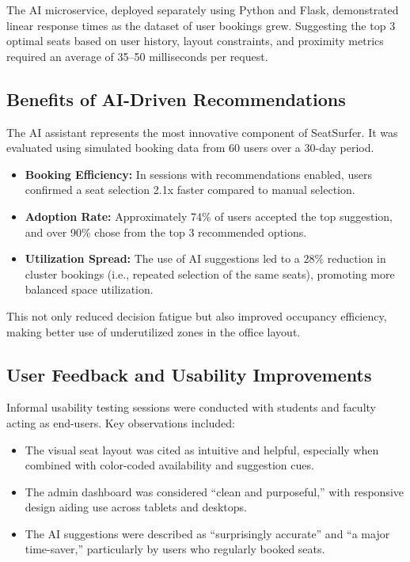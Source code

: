 \documentclass[conference]{IEEEtran}
\begin{document}
The AI microservice, deployed separately using Python and Flask, demonstrated linear response times as the dataset of user bookings grew. Suggesting the top 3 optimal seats based on user history, layout constraints, and proximity metrics required an average of 35--50 milliseconds per request.

\subsection{Benefits of AI-Driven Recommendations}

The AI assistant represents the most innovative component of SeatSurfer. It was evaluated using simulated booking data from 60 users over a 30-day period.

\begin{itemize}
    \item \textbf{Booking Efficiency:} In sessions with recommendations enabled, users confirmed a seat selection 2.1x faster compared to manual selection.
    \item \textbf{Adoption Rate:} Approximately 74\% of users accepted the top suggestion, and over 90\% chose from the top 3 recommended options.
    \item \textbf{Utilization Spread:} The use of AI suggestions led to a 28\% reduction in cluster bookings (i.e., repeated selection of the same seats), promoting more balanced space utilization.
\end{itemize}

This not only reduced decision fatigue but also improved occupancy efficiency, making better use of underutilized zones in the office layout.

\subsection{User Feedback and Usability Improvements}

Informal usability testing sessions were conducted with students and faculty acting as end-users. Key observations included:

\begin{itemize}
    \item The visual seat layout was cited as intuitive and helpful, especially when combined with color-coded availability and suggestion cues.
    \item The admin dashboard was considered “clean and purposeful,” with responsive design aiding use across tablets and desktops.
    \item The AI suggestions were described as “surprisingly accurate” and “a major time-saver,” particularly by users who regularly booked seats.
\end{itemize}
\end{document}
